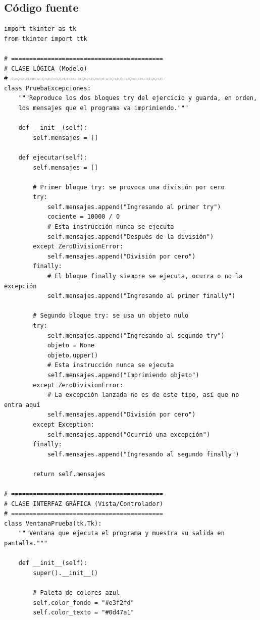 \documentclass[11pt, a4paper]{article}
\begin{document}
\subsection{Código fuente}
\begin{lstlisting}
import tkinter as tk
from tkinter import ttk

# ==========================================
# CLASE LÓGICA (Modelo)
# ==========================================
class PruebaExcepciones:
    """Reproduce los dos bloques try del ejercicio y guarda, en orden,
    los mensajes que el programa va imprimiendo."""

    def __init__(self):
        self.mensajes = []

    def ejecutar(self):
        self.mensajes = []

        # Primer bloque try: se provoca una división por cero
        try:
            self.mensajes.append("Ingresando al primer try")
            cociente = 10000 / 0
            # Esta instrucción nunca se ejecuta
            self.mensajes.append("Después de la división")
        except ZeroDivisionError:
            self.mensajes.append("División por cero")
        finally:
            # El bloque finally siempre se ejecuta, ocurra o no la excepción
            self.mensajes.append("Ingresando al primer finally")

        # Segundo bloque try: se usa un objeto nulo
        try:
            self.mensajes.append("Ingresando al segundo try")
            objeto = None
            objeto.upper()
            # Esta instrucción nunca se ejecuta
            self.mensajes.append("Imprimiendo objeto")
        except ZeroDivisionError:
            # La excepción lanzada no es de este tipo, así que no entra aquí
            self.mensajes.append("División por cero")
        except Exception:
            self.mensajes.append("Ocurrió una excepción")
        finally:
            self.mensajes.append("Ingresando al segundo finally")

        return self.mensajes

# ==========================================
# CLASE INTERFAZ GRÁFICA (Vista/Controlador)
# ==========================================
class VentanaPrueba(tk.Tk):
    """Ventana que ejecuta el programa y muestra su salida en pantalla."""

    def __init__(self):
        super().__init__()

        # Paleta de colores azul
        self.color_fondo = "#e3f2fd"
        self.color_texto = "#0d47a1"


\end{lstlisting}
\end{document}
